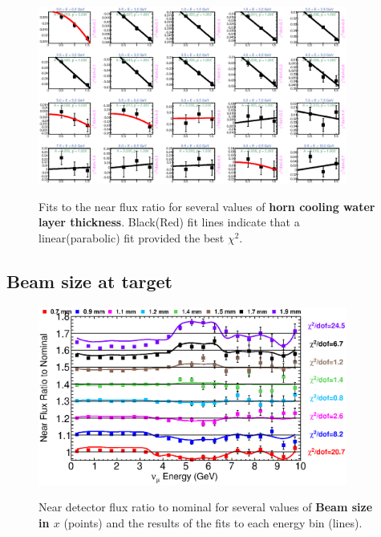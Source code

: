 \begin{figure}[hb]
  \begin{center}
    {\includegraphics[width=4.0in]{figures/NominalWaterLayer__near_fits.eps}}
  \end{center}
\caption{ Fits to the near flux ratio for several values of {\bf horn cooling water layer thickness}. Black(Red) fit lines indicate that a linear(parabolic) fit provided the best $\chi^2$. }
\end{figure}

\clearpage
\subsection{Beam size at target}

\begin{figure}[ht]
  \begin{center}
    {\includegraphics[width=4.0in]{figures/BeamSigmaX_near_summary.eps}}
  \end{center}
\caption{ Near detector flux ratio to nominal for several values of {\bf Beam size in $x$} (points) and the results of the fits to each energy bin (lines).}
\end{figure}

